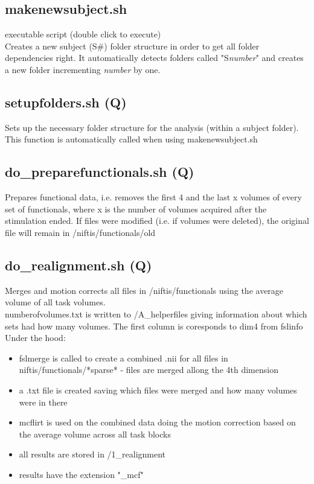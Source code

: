 \documentclass[12pt,a4paper]{scrartcl}
\begin{document}
\subsection{makenewsubject.sh}
executable script (double click to execute)\\

Creates a new subject (S\#) folder structure in order to get all folder dependencies right. It automatically detects folders called "S\textit{number}" and creates a new folder incrementing \textit{number} by one.

\subsection{setupfolders.sh (Q)}
Sets up the necessary folder structure for the analysis (within a subject folder). This function is automatically called when using makenewsubject.sh\\

\subsection{do\_preparefunctionals.sh (Q)}
\label{sec:prepfct}
Prepares functional data, i.e. removes the first 4 and the last x volumes of every set of functionals, where x is the number of volumes acquired after the stimulation ended. If files were modified (i.e. if volumes were deleted), the original file will remain in /niftis/functionals/old\\

\subsection{do\_realignment.sh (Q)}
\label{sec:realign}
Merges and motion corrects all files in /niftis/functionals using the average volume of all task volumes.\\

\noindent numberofvolumes.txt is written to /A\_helperfiles giving information about which sets had how many volumes. The first column is coresponds to dim4 from fslinfo\\

\noindent Under the hood:
\begin{itemize}
\item fslmerge is called to create a combined .nii for all files in niftis/functionals/*sparse* - files are merged allong the 4th dimension
\item a .txt file is created saving which files were merged and how many volumes were in there
\item mcflirt is used on the combined data doing the motion correction based on the average volume across all task blocks
\item all results are stored in /1\_realignment
\item results have the extension "\_mcf"
\end{itemize}
\end{document}
